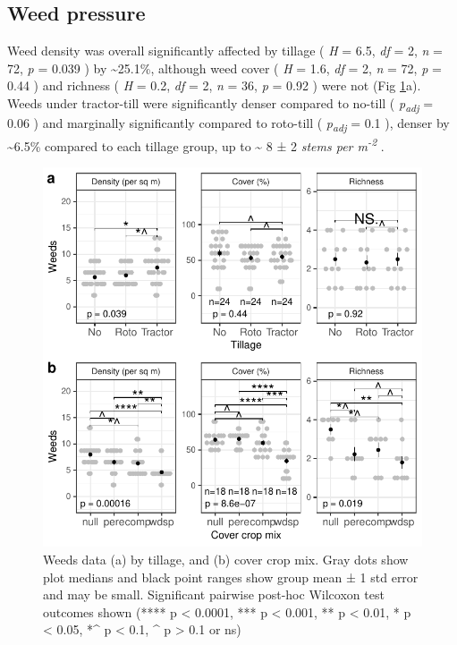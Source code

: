 \documentclass[
  12pt,
]{article}
\begin{document}
\hypertarget{weed-pressure}{%
\subsection{Weed pressure}\label{weed-pressure}}

Weed density was overall significantly affected by tillage (
\emph{H} = 6.5,
\emph{df} = 2,
\emph{n} = 72,
\emph{p} = 0.039
) by
\textasciitilde25.1\%,
although weed cover (
\emph{H} = 1.6,
\emph{df} = 2,
\emph{n} = 72,
\emph{p} = 0.44
) and richness (
\emph{H} = 0.2,
\emph{df} = 2,
\emph{n} = 36,
\emph{p} = 0.92
) were not
(Fig \ref{fig:weedsFig}a).
Weeds under tractor-till were significantly denser compared to no-till (
\emph{p\textsubscript{adj}} = 0.06
) and marginally significantly compared to roto-till (
\emph{p\textsubscript{adj}} = 0.1
), denser by
\textasciitilde6.5\%
compared to each tillage group,
up to
\textasciitilde{} 8 ±
2 \emph{stems per m\textsuperscript{-2}}
.

\begin{figure}
\centering
\includegraphics{merge_files/figure-latex/weedsFig-1.pdf}
\caption{\label{fig:weedsFig}Weeds data (a) by tillage, and (b) cover crop mix. Gray dots show plot medians and black point ranges show group mean ± 1 std error and may be small. Significant pairwise post-hoc Wilcoxon test outcomes shown (**** p \textless{} 0.0001, *** p \textless{} 0.001, ** p \textless{} 0.01, * p \textless{} 0.05, *\^{} p \textless{} 0.1, \^{} p \textgreater{} 0.1 or ns)}
\end{figure}
\end{document}
